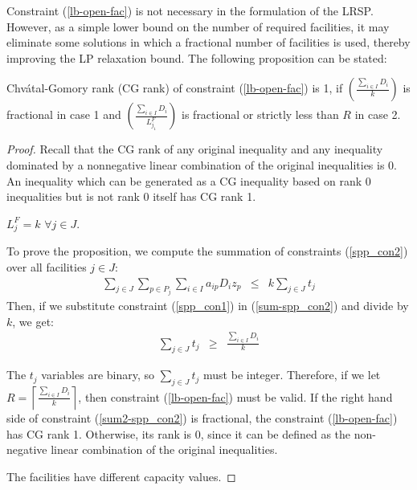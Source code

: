 Constraint (\ref{lb-open-fac}) is not necessary in the formulation of the LRSP. However, as a simple
lower bound on the number of required facilities, it may eliminate some solutions in which 
a fractional number of facilities is used, thereby improving the LP relaxation bound.
 The following proposition can be stated:

\begin {prop} 
Chv\'atal-Gomory rank (CG rank) of constraint (\ref{lb-open-fac}) is 1, if
$\left (\frac{\sum_{i \in I }D_i}{k}\right)$ is fractional in case 1 and
$\left (\frac{\sum_{i \in I }D_i}{L^F_{j_1}}\right)$ is fractional or strictly less 
than $R$ in case 2. 
\end {prop}

\begin{proof}

Recall that the CG rank of any original inequality and any 
inequality dominated by a nonnegative linear combination of the original inequalities 
is 0.  An inequality which can be generated as a CG inequality based on rank 0 inequalities 
but is not rank 0 itself has CG rank 1. 

 $L^F_j = k$ $\forall j \in J$.

To prove the proposition, we compute the summation of constraints (\ref{spp_con2}) over all 
facilities $j \in J$:
\begin{eqnarray}
 \sum_{j \in J} \sum_{p \in P_j} \sum_{i \in I} a_{ip} D_i z_{p} & \leq & k \sum_{j \in J} t_{j} \label{sum-spp_con2}
\end{eqnarray} 
Then, if we substitute constraint (\ref{spp_con1}) in (\ref{sum-spp_con2}) and divide by $k$, we get:
\begin{eqnarray}
 \sum_{j \in J} t_{j} &\geq &\frac {\sum_{i \in I}D_i}{k} \label{sum2-spp_con2}
\end{eqnarray} 

The $t_j$ variables are binary, so $\sum_{j \in J}t_{j}$ must be integer. 
Therefore, if we let 
$R =\left \lceil \frac{\sum_{i \in I }D_i}{k} \right \rceil$, then constraint
(\ref{lb-open-fac}) must be valid. If  the right hand side of constraint (\ref{sum2-spp_con2})
is fractional, the constraint (\ref{lb-open-fac}) has CG rank 1. Otherwise, its rank is 0,
since it can be defined as the non-negative linear combination of the original inequalities.
 

 The facilities have different capacity values. 


\end{proof}
